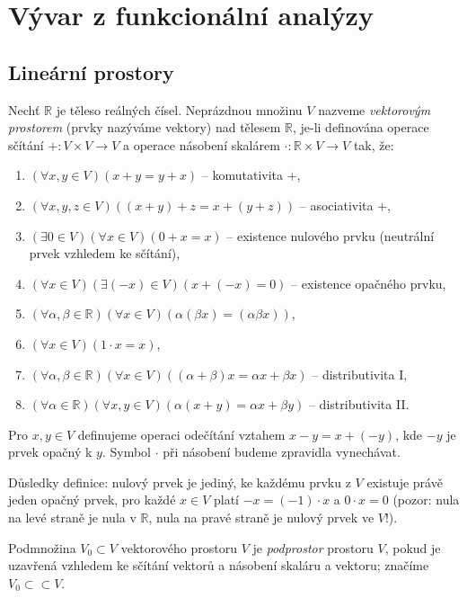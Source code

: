 \chapter{Vývar z funkcionální analýzy}

\section{Lineární prostory}

Nechť $\mathbb{R}$ je těleso reálných čísel.
Neprázdnou množinu $V$ nazveme \emph{vektorovým prostorem} (prvky nazýváme vektory)
nad tělesem $\mathbb{R}$, je-li definována operace sčítání 
$+:V\times V\rightarrow V$ a operace násobení skalárem 
$\cdot:\mathbb{R}\times V\rightarrow V$ tak, že:
\begin{enumerate}
   \item $(\forall x,y\in V)(x+y=y+x)$ -- komutativita $+$,
   \item $(\forall x,y,z\in V)((x+y)+z=x+(y+z))$ -- asociativita $+$,
   \item $(\exists 0\in V)(\forall x\in V)(0+x=x)$ -- existence nulového prvku 
           (neutrální prvek vzhledem ke sčítání),
   \item $(\forall x\in V)(\exists (-x)\in V)(x+(-x)=0)$ -- existence opačného prvku,
   \item $(\forall \alpha,\beta\in\mathbb{R})(\forall x\in V)
          (\alpha(\beta x)=(\alpha\beta x))$,
   \item $(\forall x\in V)(1\cdot x = x)$,
   \item $(\forall \alpha,\beta\in\mathbb{R})(\forall x\in V)
         ((\alpha+\beta)x=\alpha x+\beta x)$ -- distributivita I,
   \item $(\forall \alpha\in\mathbb{R})(\forall x,y\in V)
         (\alpha(x+y)=\alpha x+\beta y)$ -- distributivita II.
\end{enumerate}
Pro $x,y\in V$ definujeme operaci odečítání vztahem $x-y=x+(-y)$,
kde $-y$ je prvek opačný k $y$. Symbol $\cdot$ při násobení budeme zpravidla
vynechávat.

Důsledky definice: nulový prvek je jediný, ke každému prvku z $V$ existuje
právě jeden opačný prvek, pro každé $x\in V$ platí $-x=(-1)\cdot x$
a $0\cdot x = 0$ (pozor: nula na levé straně je nula v $\mathbb{R}$, nula na pravé
straně je nulový prvek ve $V$!).

Podmnožina $V_0\subset V$ vektorového prostoru $V$ je \emph{podprostor}
prostoru $V$, pokud je uzavřená vzhledem ke sčítání vektorů a násobení skaláru
a vektoru; značíme $V_0\subset\subset V$.


